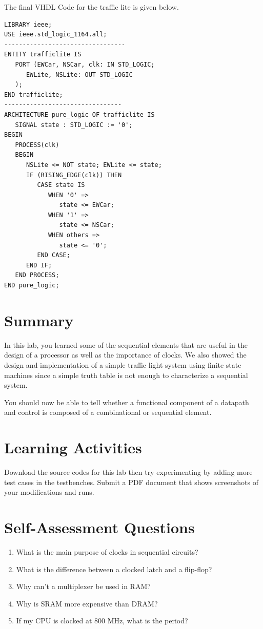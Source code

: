\documentclass[a4paper, 11pt,oneside]{article}
\begin{document}
The final VHDL Code for the traffic lite is given below.

\begin{verbatim}
LIBRARY ieee;
USE ieee.std_logic_1164.all;
---------------------------------
ENTITY trafficlite IS
   PORT (EWCar, NSCar, clk: IN STD_LOGIC;
      EWLite, NSLite: OUT STD_LOGIC
   );
END trafficlite;
--------------------------------
ARCHITECTURE pure_logic OF trafficlite IS
   SIGNAL state : STD_LOGIC := '0'; 
BEGIN
   PROCESS(clk)
   BEGIN
      NSLite <= NOT state; EWLite <= state;
      IF (RISING_EDGE(clk)) THEN
         CASE state IS
            WHEN '0' =>
               state <= EWCar;
            WHEN '1' =>
               state <= NSCar;
            WHEN others => 
               state <= '0';
         END CASE;
      END IF; 
   END PROCESS;
END pure_logic;
\end{verbatim}


\section{Summary}
In this lab, you learned some of the sequential elements that are useful in the 
design of a processor as well as the importance of clocks. We also showed the
design and implementation of a simple traffic light system using finite state 
machines since a simple truth table is not enough to characterize a sequential 
system. 

You should now be able to tell whether a functional component of a datapath and 
control is composed of a combinational or sequential element.

\section{Learning Activities}
Download the source codes for this lab then try experimenting by adding more 
test cases in the testbenches. Submit a PDF document that shows screenshots of 
your modifications and runs. 

\section{Self-Assessment Questions}
\begin{enumerate}
\item What is the main purpose of clocks in sequential circuits?
\item What is the difference between a clocked latch and a flip-flop?
\item Why can't a multiplexer be used in RAM?
\item Why is SRAM more expensive than DRAM?
\item If my CPU is clocked at 800 MHz, what is the period?
\end{enumerate}
\end{document}
